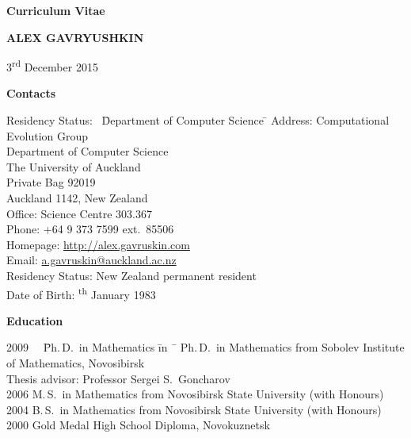 \documentclass[12pt]{article}
\begin{document}
\centerline{\large \bf Curriculum Vitae}
\vskip5mm
\centerline{\Large \bfseries A\normalsize LEX \Large G\normalsize AVRYUSHKIN}
\vskip5mm
\centerline{3\textsuperscript{rd} December 2015}
\vskip5mm

\centerline{\bf Contacts}
\begin{tabbing}
Residency Status:     \  \= Department of Computer Science \= \kill
Address:        \> Computational Evolution Group \\
		\> Department of Computer Science \\
		\> The University of Auckland\\
                \> Private Bag 92019\\
                \> Auckland 1142, New Zealand\\
Office:         \> Science Centre 303.367\\
Phone:          \> +64 9 373 7599 ext.\ 85506\\
Homepage:     \> \href{http://alex.gavruskin.com}{http://alex.gavruskin.com}   \\
Email:        \> \href{mailto:a.gavruskin@auckland.ac.nz}{a.gavruskin@auckland.ac.nz} \\
Residency Status:        \>New Zealand permanent resident\\
Date of Birth: \textsuperscript{th} January 1983\\
\end{tabbing}

\centerline{\bf Education}
\begin{tabbing}
2009 \ \ \= Ph.\,D.\ in Mathematics \= in \ \=        \> Ph.\,D.\ in Mathematics \>  from Sobolev Institute of Mathematics, Novosibirsk\\
                \>             \>  Thesis advisor: Professor Sergei S.\ Goncharov\\
2006       \> M.\,S.\ in Mathematics \>  from Novosibirsk State University (with Honours)\\
2004       \> B.\,S.\ in Mathematics \>  from Novosibirsk State University (with Honours)\\
2000       \> Gold Medal High School Diploma, Novokuznetsk%
\end{tabbing}
\end{document}
